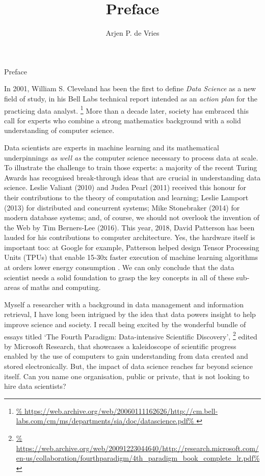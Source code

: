\documentclass[12pt]{article}
\title{Preface}
\author {Arjen P. de Vries}
\begin{document}
\begin{center} \Large Preface\end{center}

In 2001, William S. Cleveland has been the first to define \emph{Data Science} as a new field of study, in his Bell Labs technical report intended as an \emph{action plan} for the practicing data analyst.%
\footnote{\url{%
https://web.archive.org/web/20060111162626/http://cm.bell-labs.com/cm/ms/departments/sia/doc/datascience.pdf%
}}
More than a decade later, society has embraced this call for experts who combine a strong mathematics background with a solid understanding of computer science. 

Data scientists are experts in machine learning and its mathematical underpinnings \emph{as well as} the computer science necessary to process data at scale. To illustrate the challenge to train those experts: a majority of the recent Turing Awards has recognised break-through ideas that are crucial in understanding data science. Leslie Valiant (2010) and Judea Pearl (2011) received this honour for their contributions to the theory of computation and learning; Leslie Lamport (2013) for distributed and concurrent systems; Mike Stonebraker (2014) for modern database systems; and, of course, we should not overlook the invention of the Web by Tim Berners-Lee (2016). This year, 2018, David Patterson has been lauded for his contributions to computer architecture. Yes, the hardware itself is important too: at Google for example, Patterson helped design Tensor Processing Units (TPUs) that enable 15-30x faster execution of machine learning algorithms at orders lower energy consumption \cite{Jouppi:2017:IPA:3140659.3080246}. We can only conclude that the data scientist needs a solid foundation to grasp the key concepts in all of these sub-areas of maths and computing. 

Myself a researcher with a background in data management and information retrieval, I have long been intrigued by the idea that data powers insight to help improve science and society. I recall being excited by the wonderful bundle of essays titled `The Fourth Paradigm: Data-intensive Scientific Discovery',%
\footnote{\url{%
https://web.archive.org/web/20091223044640/http://research.microsoft.com/en-us/collaboration/fourthparadigm/4th_paradigm_book_complete_lr.pdf%
}}
edited by Microsoft Research, that showcases a kaleidoscope of scientific progress enabled by the use of computers to gain understanding from data created and stored electronically.
But, the impact of data science reaches far beyond science itself. Can you name one organisation, public or private, that is not looking to hire data scientists? 
\end{document}
